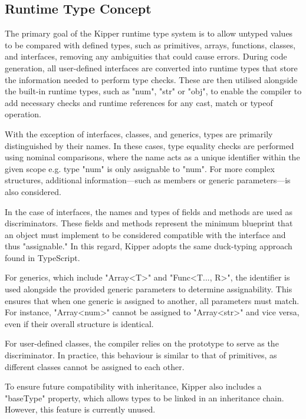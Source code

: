 \subsection{Runtime Type Concept}

The primary goal of the Kipper runtime type system is to allow untyped values to be compared with defined types, such as primitives, arrays, functions, classes, and interfaces, removing any ambiguities that could cause errors. During code generation, all user-defined interfaces are converted into runtime types that store the information needed to perform type checks. These are then utilised alongside the built-in runtime types, such as "num", "str" or "obj", to enable the compiler to add necessary checks and runtime references for any cast, match or typeof operation.

With the exception of interfaces, classes, and generics, types are primarily distinguished by their names. In these cases, type equality checks are performed using nominal comparisons, where the name acts as a unique identifier within the given scope e.g. type "num" is only assignable to "num". For more complex structures, additional information—such as members or generic parameters—is also considered.

In the case of interfaces, the names and types of fields and methods are used as discriminators. These fields and methods represent the minimum blueprint that an object must implement to be considered compatible with the interface and thus "assignable." In this regard, Kipper adopts the same duck-typing approach found in TypeScript.

For generics, which include "Array<T>" and "Func<T..., R>", the identifier is used alongside the provided generic parameters to determine assignability. This ensures that when one generic is assigned to another, all parameters must match. For instance, "Array<num>" cannot be assigned to "Array<str>" and vice versa, even if their overall structure is identical.

For user-defined classes, the compiler relies on the prototype to serve as the discriminator. In practice, this behaviour is similar to that of primitives, as different classes cannot be assigned to each other.

To ensure future compatibility with inheritance, Kipper also includes a "baseType" property, which allows types to be linked in an inheritance chain. However, this feature is currently unused.

